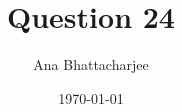 \documentclass{article}
\begin{document}
\title{Question 24}
\author{Ana Bhattacharjee}
\date{\today}
\maketitle{}
\end{document}

